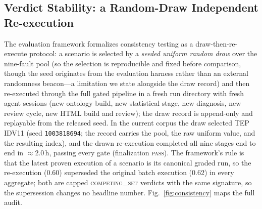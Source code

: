\documentclass[preprint,10pt]{elsarticle}
\begin{document}
\subsection{Verdict Stability: a Random-Draw Independent Re-execution}\label{sec:stability}
The evaluation framework formalizes consistency testing as a draw-then-re-execute protocol: a scenario is selected by a \emph{seeded uniform random draw} over the nine-fault pool (so the selection is reproducible and fixed before comparison, though the seed originates from the evaluation harness rather than an external randomness beacon---a limitation we state alongside the draw record) and then re-executed through the full gated pipeline in a fresh run directory with fresh agent sessions (new ontology build, new statistical stage, new diagnosis, new review cycle, new HTML build and review); the draw record is append-only and replayable from the released seed. In the current corpus the draw selected TEP IDV11 (seed \texttt{1003818694}; the record carries the pool, the raw uniform value, and the resulting index), and the drawn re-execution completed all nine stages end to end in $\approx$2.0\,h, passing every gate (finalization \textsc{pass}). The framework's rule is that the latest proven execution of a scenario is its canonical graded run, so the re-execution (0.60) superseded the original batch execution (0.62) in every aggregate; both are capped \mbox{\textsc{competing\_set}} verdicts with the same signature, so the supersession changes no headline number. Fig.~\ref{fig:consistency} maps the full audit.
\end{document}
